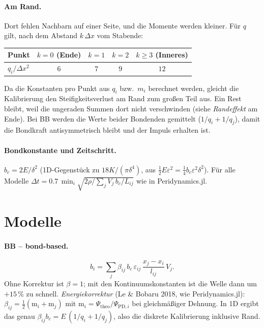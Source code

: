 \documentclass[a4paper,11pt]{article}
\begin{document}
\paragraph{Am Rand.} Dort fehlen Nachbarn auf einer Seite, und die Momente werden kleiner. Für $q$ gilt, nach dem Abstand
$k\,\Delta x$ vom Stabende:
\begin{center}
\begin{tabular}{@{}lcccc@{}}
  \toprule
  Punkt & $k=0$ (Ende) & $k=1$ & $k=2$ & $k\ge3$ (Inneres) \\
  \midrule
  $q_i/\Delta x^2$ & $6$ & $7$ & $9$ & $12$ \\
  \bottomrule
\end{tabular}
\end{center}
Da die Konstanten pro Punkt aus $q_i$ bzw.\ $m_i$ berechnet werden, gleicht die Kalibrierung den Steifigkeitsverlust am Rand
zum großen Teil aus. Ein Rest bleibt, weil die ungeraden Summen dort nicht verschwinden (siehe \emph{Randeffekt} am Ende).
Bei BB werden die Werte beider Bondenden gemittelt ($1/q_i + 1/q_j$), damit die Bondkraft antisymmetrisch bleibt und der Impuls
erhalten ist.

\paragraph{Bondkonstante und Zeitschritt.} $b_c = 2E/\delta^2$ (1D-Gegenstück zu $18K/(\pi\delta^4)$,
aus $\tfrac12 E\varepsilon^2 = \tfrac14 b_c\varepsilon^2\delta^2$). Für alle Modelle
$\Delta t = 0.7\,\min_i \sqrt{2\rho \big/ \textstyle\sum_j V_j\, b_c/L_{ij}}$ wie in Peridynamics.jl.

\section*{Modelle}

\paragraph{BB -- bond-based.}
\[
  b_i = \sum_{j} \beta_{ij}\, b_c\, \varepsilon_{ij}\,\frac{x_j-x_i}{l_{ij}}\,V_j .
\]
Ohne Korrektur ist $\beta = 1$; mit den Kontinuumskonstanten ist die Welle dann um $+15\,\%$ zu schnell.
\emph{Energiekorrektur} (Le \& Bobaru 2018, wie Peridynamics.jl):
$\beta_{ij} = \tfrac12(\mathrm{m}_i + \mathrm{m}_j)$ mit $\mathrm{m}_i = \Psi_\mathrm{theo}/\Psi_{\mathrm{PD},i}$
bei gleichmäßiger Dehnung. In 1D ergibt das genau
$\beta_{ij} b_c = E\,(1/q_i + 1/q_j)$, also die diskrete Kalibrierung inklusive Rand.
\end{document}
